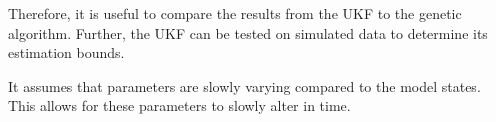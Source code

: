 	Therefore, it is useful to compare the results from the UKF to the genetic algorithm.
	Further, the UKF can be tested on simulated data to determine its estimation bounds.
	

	It assumes that parameters are slowly varying compared to the model states.
	This allows for these parameters to slowly alter in time.

%
%
%

